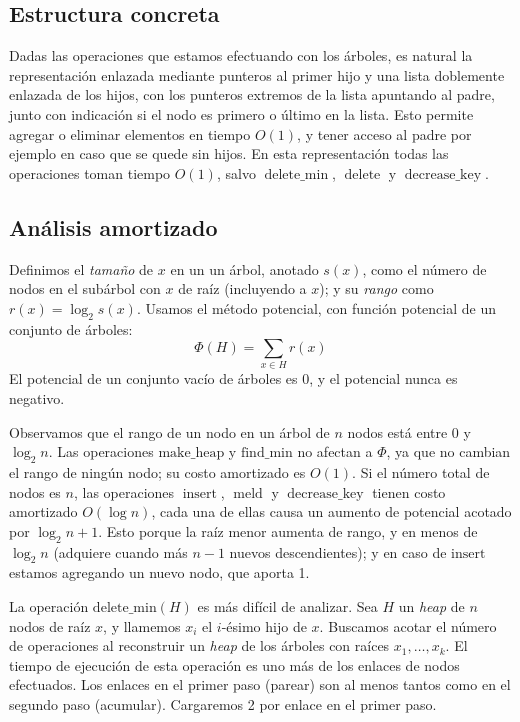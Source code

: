 \subsection{Estructura concreta}
\label{sec:ph-concreta}

  Dadas las operaciones que estamos efectuando con los árboles,
  es natural la representación enlazada mediante punteros al primer hijo
  y una lista doblemente enlazada de los hijos,
  con los punteros extremos de la lista apuntando al padre,
  junto con indicación si el nodo es primero o último en la lista.
  Esto permite agregar o eliminar elementos en tiempo \(O(1)\),
  y tener acceso al padre por ejemplo en caso que se quede sin hijos.
  En esta representación todas las operaciones toman tiempo \(O(1)\),
  salvo \(\operatorname{delete\_min}\),
  \(\operatorname{delete}\) y \(\operatorname{decrease\_key}\).

\subsection{Análisis amortizado}
\label{sec:ph-analisis-amortizado}

  Definimos el \emph{tamaño} de \(x\) en un un árbol,
  anotado \(s(x)\),
  como el número de nodos en el subárbol con \(x\) de raíz
  (incluyendo a \(x\));
  y su \emph{rango} como \(r(x) = \log_2 s(x)\).
  Usamos el método potencial,
  con función potencial de un conjunto de árboles:
  \begin{equation}
    \label{eq:ph-phi}
    \Phi(H)
      = \sum_{x \in H} r(x)
  \end{equation}
  El potencial de un conjunto vacío de árboles es \num{0},
  y el potencial nunca es negativo.

  Observamos que el rango de un nodo en un árbol de \(n\) nodos
  está entre \num{0} y \(\log_2 n\).
  Las operaciones \(\mathrm{make\_heap}\)
  y \(\mathrm{find\_min}\) no afectan a \(\Phi\),
  ya que no cambian el rango de ningún nodo;
  su costo amortizado es \(O(1)\).
  Si el número total de nodos es \(n\),
  las operaciones \(\operatorname{insert}\),
  \(\operatorname{meld}\) y \(\operatorname{decrease\_key}\)
  tienen costo amortizado \(O(\log n)\),
  cada una de ellas causa un aumento de potencial acotado por \(\log_2 n + 1\).
  Esto porque la raíz menor aumenta de rango,
  y en menos de \(\log_2 n\)
  (adquiere cuando más \(n - 1\) nuevos descendientes);
  y en caso de \(\mathrm{insert}\) estamos agregando un nuevo nodo,
  que aporta \num{1}.

  La operación \(\mathrm{delete\_min}(H)\) es más difícil de analizar.
  Sea \(H\) un \emph{\foreignlanguage{english}{heap}} de \(n\) nodos
  de raíz \(x\),
  y llamemos \(x_i\) el \(i\)\nobreakdash-ésimo hijo de \(x\).
  Buscamos acotar el número de operaciones
  al reconstruir un \emph{\foreignlanguage{english}{heap}}
  de los árboles con raíces \(x_1, \dotsc, x_k\).
  El tiempo de ejecución de esta operación es uno más
  de los enlaces de nodos efectuados.
  Los enlaces en el primer paso
  (parear)
  son al menos tantos como en el segundo paso
  (acumular).
  Cargaremos \num{2} por enlace en el primer paso.


